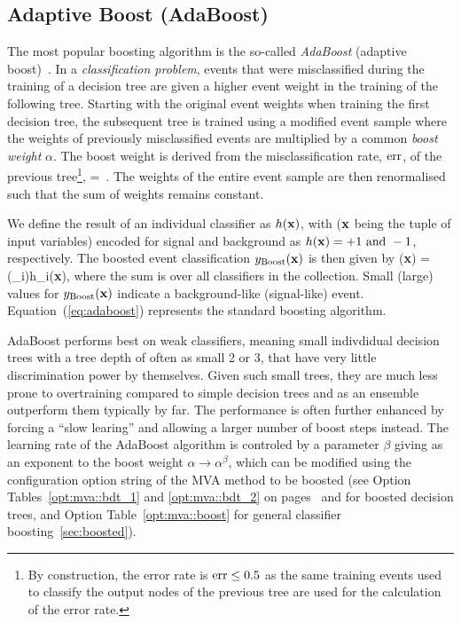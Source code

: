 \subsection{Adaptive Boost (AdaBoost)}
\label{sec:adaboost}

The most popular boosting algorithm is the so-called {\em  AdaBoost} 
(adaptive boost)~\cite{AdaBoost}. 
In a {\em classification problem}, events that were misclassified during the
training of a decision tree are given a higher event weight in the training of
the following tree.  Starting with the original event weights 
when training the first decision tree, the subsequent tree is trained 
using a modified event sample where the weights of previously
misclassified events are multiplied by a common {\em boost weight}
$\alpha$. The boost weight is derived from the misclassification rate,
${\rm err}$, of the previous tree\footnote 
{ 
   By construction, the error rate is ${\rm err}\le0.5$ as the same 
   training events used to classify the output nodes of the previous
   tree are used for the calculation of the error rate.  
}, 
\beq
\label{eq:boost}
   \alpha = \,.  
\eeq 
The weights of the entire event sample are then renormalised such that the 
sum of weights remains constant.  
 
We define the result of an individual classifier as $h({\bf x})$, 
with (${\bf x}$ being the tuple of input variables) encoded for signal 
and background as $h({\bf x}) = +1\ \mbox{and }-1$, respectively. 
The boosted event classification $ y_\text{Boost}(\bf{x})$ is then given by 
\beq
\label{eq:adaboost}
  \yBoost({\bf x}) =   
                     \ln(\alpha_i)\cdot h_i({\bf x})\:,
\eeq
where the sum is over all classifiers in the collection. Small (large)
values for $ y_\text{Boost}({\bf x})$ indicate a background-like (signal-like)
event. Equation~(\ref{eq:adaboost}) represents the standard boosting algorithm.

AdaBoost performs best on weak classifiers, meaning small indivdidual
decision trees with a tree depth of often as small 2 or 3, that have very little
discrimination power by themselves.  Given such small trees,
they are much less prone to overtraining compared to simple decision
trees and as an ensemble outperform them typically by far. The performance is
often further enhanced by forcing a ``slow learing'' and allowing a larger number
of boost steps instead. The learning rate of the AdaBoost algorithm is controled
by a parameter $\beta$ giving as an exponent to the boost weight $\alpha \rightarrow \alpha^\beta$,
which can be modified using the configuration option string of the MVA method to 
be boosted (see Option Tables~\ref{opt:mva::bdt_1} and \ref{opt:mva::bdt_2} 
on pages~\pageref{opt:mva::bdt_1} and \pageref{opt:mva::bdt_1} for 
boosted decision trees, and Option Table~\ref{opt:mva::boost} for general
classifier boosting~\ref{sec:boosted}).



